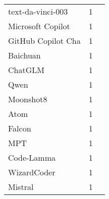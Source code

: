 \begin{table}[!htbp]
\begin{tabular}{@{}l c p{4cm}@{}}
		text-da-vinci-003 & 1 & \cite{prather2024interactions} \\
		Microsoft Copilot & 1 & \cite{agarwal2024which} \\
		GitHub Copilot Cha & 1 & \cite{agarwal2024which} \\
		Baichuan & 1 & \cite{xiao2024qacp} \\
		ChatGLM & 1 & \cite{xiao2024qacp} \\
		Qwen & 1 & \cite{xiao2024qacp} \\
		Moonshot8 & 1 & \cite{xiao2024qacp} \\
		Atom & 1 & \cite{xiao2024qacp} \\
		Falcon & 1 & \cite{raihan2024cseprompts} \\
		MPT & 1 & \cite{raihan2024cseprompts} \\
		Code-Lamma & 1 & \cite{raihan2024cseprompts} \\
		WizardCoder & 1 & \cite{raihan2024cseprompts} \\
		Mistral & 1 & \cite{raihan2024cseprompts} \\
	\bottomrule
    \end{tabular}
    \label{tab:llms}
\end{table}